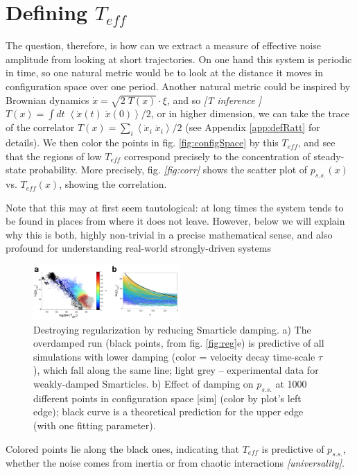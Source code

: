 \documentclass[reprint,prx]{revtex4-1}
\renewcommand{\=}[1]{\stackrel{#1}{=}} %
\renewcommand{\(}{\left (}
\renewcommand{\)}{\right  )}
\renewcommand{\[}{\left [}
\renewcommand{\]}{\right ]}
\newcommand{\<}{\left <}
\renewcommand{\>}{\right >}
\theoremstyle{definition}
\theoremstyle{remark}
\renewcommand{\todo}[1]{\textit{\color{red}[#1]}}
\begin{document}
\section{Defining $ T_{eff} $}
The question, therefore, is how can we extract a measure of effective noise amplitude from looking at short trajectories. On one hand this system is periodic in time, so one natural metric would be to look at the distance it moves in configuration space over one period. Another natural metric could be inspired by Brownian dynamics $ \dot{x}=\sqrt{2\;T(x)}\cdot\xi $, and so \todo{T inference }$ T(x)=\int dt\;\<\dot{x}(t)\;\dot{x}(0)\>/2 $, or in higher dimension, we can take the trace of the correlator $ T(x)=\sum_i\<\dot{x}_i\;\dot{x}_i\>/2 $ (see Appendix \ref{app:defRatt} for details). 
We then color the points in fig. \ref{fig:configSpace} by this $ T_{eff} $, and see that the regions of low $ T_{eff} $ correspond precisely to the concentration of steady-state probability. More precisely, fig. \todo{fig:corr} shows the scatter plot of $ p_{s.s.}(x) $ vs. $ T_{eff}(x) $, showing the correlation.

Note that this may at first seem tautological: at long times the system tends to be found in places from where it does not leave. However, below we will explain why this is both, highly non-trivial in a precise mathematical sense, and also profound for understanding real-world strongly-driven systems 
\begin{figure}
	\includegraphics[width=0.5\textwidth]{inertial.png}
	\caption{Destroying regularization by reducing Smarticle damping. a) The overdamped run (black points, from fig. \ref{fig:reg}e) is predictive of all simulations with lower damping (color = velocity decay time-scale $ \tau $), which fall along the same line; light grey -- experimental data for weakly-damped Smarticles. b) Effect of damping on $ p_{s.s.} $ at 1000 different points in configuration space [sim] (color by plot's left edge); black curve is a theoretical prediction for the upper edge (with one fitting parameter).}
	\label{fig:inertial}
\end{figure}
Colored points lie along the black ones, indicating that $T_{eff}$ is predictive of $p_{s.s.}$, whether the noise comes from inertia or from chaotic interactions \todo{universality}.
 
\end{document}
